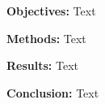 \textbf{Objectives:} Text

\textbf{Methods:}
Text

\textbf{Results:}
Text

\textbf{Conclusion:}
Text